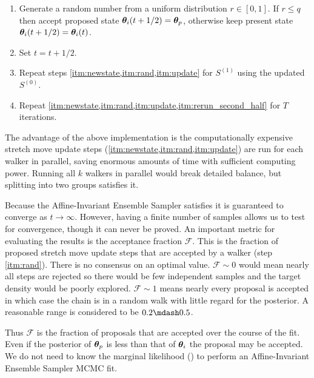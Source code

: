 \begin{enumerate}
\item \label{itm:rand} Generate a random number from a uniform distribution $r \in [0, 1]$.  If $r \leq q$ then accept proposed state
$\boldsymbol{\theta}_i(t + 1/2) = \boldsymbol{\theta}_p$, otherwise keep present state $\boldsymbol{\theta}_i(t + 1/2) = \boldsymbol{\theta}_i(t)$.

\item \label{itm:update}  Set $t = t + 1/2$.

\item \label{itm:rerun_second_half} Repeat steps \cref{itm:newstate,itm:rand,itm:update} for $S^{(1)}$ using the updated $S^{(0)}$.

\item Repeat \cref{itm:newstate,itm:rand,itm:update,itm:rerun_second_half} for $T$ iterations.
\end{enumerate}

The advantage of the above implementation is the computationally expensive stretch move update steps
(\cref{itm:newstate,itm:rand,itm:update}) are run
for each walker in parallel, saving enormous amounts of time with sufficient computing power.  Running all $k$ walkers in parallel would
break detailed balance, but splitting into two groups satisfies it.

Because the Affine-Invariant Ensemble Sampler satisfies  it is guaranteed
to converge as $t \rightarrow \infty$.  However, having a finite number of samples allows us to test for convergence,
though it can never be proved.  An important metric for evaluating the results is the acceptance fraction
$\mathcal{F}$.  This is the fraction of proposed stretch move update steps that are accepted by a walker (step \cref{itm:rand}).  There is
no consensus on an optimal value.  $\mathcal{F} \sim 0$ would mean nearly all steps are rejected so there would be few independent samples
and the target density would be poorly explored.  $\mathcal{F} \sim 1$ means nearly every proposal is accepted in which case
the chain is in a random walk with little regard for the posterior.  A reasonable range is considered to be $0.2 \mdash 0.5$.

Thus $\mathcal{F}$ is
the fraction of proposals that are accepted over the course of the fit.  Even if the posterior of $\boldsymbol{\theta}_p$ is less than
that of $\boldsymbol{\theta}_i$ the proposal may be accepted.  We do not need to know the marginal
likelihood () to perform an Affine-Invariant Ensemble Sampler MCMC
fit.

